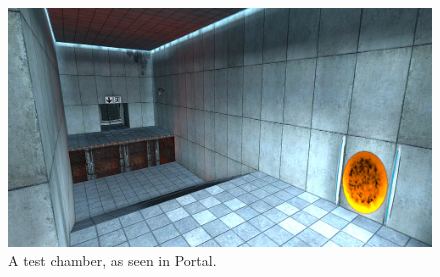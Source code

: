\begin{figure}[h!]
	\centering
	\includegraphics[angle=90,origin=c,scale=0.6]{pictures/portalChamber.jpg}
	\caption{A test chamber, as seen in Portal.\cite{portalChamberPic}}
	\label{portalChamber}
\end{figure}
